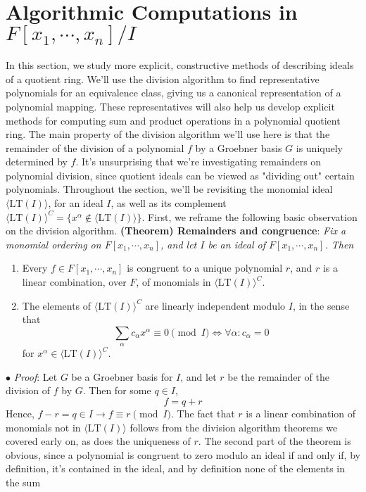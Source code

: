 \documentclass{article}
\newcommand*{\tb}{\textbf}
\newcommand*{\ti}{\textit}
\newcommand*{\n}{\newline}
\newcommand*{\nn}{\newline \newline}
\newcommand*{\Pf}{\indent \ensuremath{\bullet} \textit{Proof}: }
\newcommand*{\Fx}{\ensuremath{F[x_1, \cdots, x_n]}}
\begin{document}
\section{Algorithmic Computations in $ \Fx / I $}
In this section, we study more explicit, constructive methods of describing ideals of a quotient ring. We'll use the division algorithm to find representative polynomials for an equivalence class, giving us a canonical representation of a polynomial mapping. These representatives will also help us develop explicit methods for computing sum and product operations in a polynomial quotient ring. The main property of the division algorithm we'll use here is that the remainder of the division of a polynomial $ f $ by a Groebner basis $ G $ is uniquely determined by $ f $. It's unsurprising that we're investigating remainders on polynomial division, since quotient ideals can be viewed as "dividing out" certain polynomials. Throughout the section, we'll be revisiting the monomial ideal $ \langle \text{LT}(I) \rangle $, for an ideal $ I $, as well as its complement $ \langle \text{LT}(I) \rangle^C = \{ x^\alpha \not \in \langle \text{LT}(I) \rangle \} $.
\n
First, we reframe the following basic observation on the division algorithm.
\nn
\tb{(Theorem) Remainders and congruence}: \ti{Fix a monomial ordering on $ \Fx $, and let $ I $ be an ideal of $ \Fx $. Then}
\begin{enumerate}
    \item Every $ f \in \Fx $ is congruent to a unique polynomial $ r $, and $ r $ is a linear combination, over $ F $, of monomials in $ \langle \text{LT}(I) \rangle^C $.
    \item The elements of $ \langle \text{LT}(I) \rangle^C $ are linearly independent modulo $ I $, in the sense that
    $$ \sum_\alpha c_\alpha x^\alpha \equiv 0 \pmod{I} \iff \forall \alpha: c_\alpha = 0 $$
    for $ x^\alpha \in \langle \text{LT}(I) \rangle^C $.
\end{enumerate}
\Pf Let $ G $ be a Groebner basis for $ I $, and let $ r $ be the remainder of the division of $ f $ by $ G $. Then for some $ q \in I $,
$$ f = q + r $$
Hence, $ f - r = q \in I \rightarrow f \equiv r \pmod{I} $. The fact that $ r $ is a linear combination of monomials not in $ \langle \text{LT}(I) \rangle $ follows from the division algorithm theorems we covered early on, as does the uniqueness of $ r $.
\n
The second part of the theorem is obvious, since a polynomial is congruent to zero modulo an ideal if and only if, by definition, it's contained in the ideal, and by definition none of the elements in the sum
\end{document}
